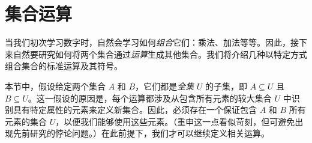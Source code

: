\section{集合运算}\label{sec:section3.5}

当我们初次学习数字时，自然会学习如何\emph{组合}它们：乘法、加法等等。因此，接下来自然要研究如何将两个集合通过\emph{运算}生成其他集合。我们将介绍几种以特定方式组合集合的标准运算及其符号。

本节中，假设给定两个集合 $A$ 和 $B$，它们都是\emph{全集} $U$ 的子集，即 $A \subseteq U$ 且 $B \subseteq U$。这一假设的原因是，每个运算都涉及从包含所有元素的较大集合 $U$ 中识别具有特定属性的元素来定义新集合。因此，必须存在一个保证包含 $A$ 和 $B$ 所有元素的集合 $U$，以便我们能够使用这些元素。（重申这一点看似苛刻，但可避免出现先前研究的悖论问题。）在此前提下，我们才可以继续定义相关运算。









